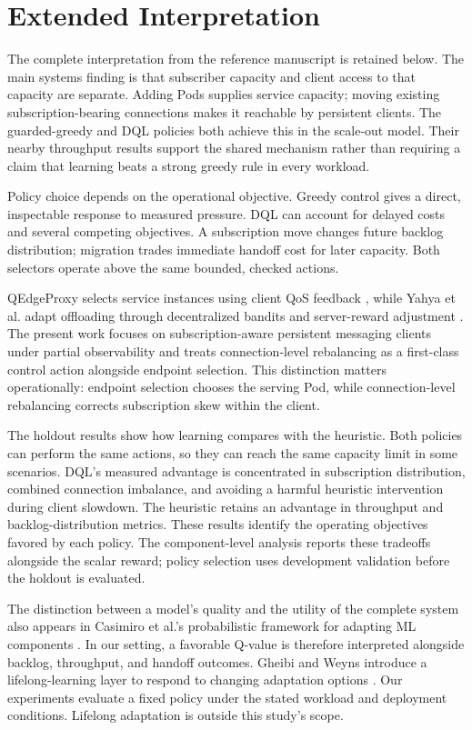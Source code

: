\section{Extended Interpretation}
The complete interpretation from the reference manuscript is retained below.
The main systems finding is that subscriber capacity and client access to that
capacity are separate. Adding Pods supplies service capacity; moving existing
subscription-bearing connections makes it reachable by persistent clients.
The guarded-greedy and DQL policies both achieve this in the scale-out model.
Their nearby throughput results support the shared mechanism rather than
requiring a claim that learning beats a strong greedy rule in every workload.

Policy choice depends on the operational objective. Greedy control gives a
direct, inspectable response to measured pressure. DQL can account for delayed
costs and several competing objectives. A subscription move changes future
backlog distribution; migration trades immediate handoff cost for later
capacity. Both selectors operate above the same bounded, checked actions.

QEdgeProxy selects service instances using client QoS feedback
\cite{Cilic2025}, while Yahya et al. adapt offloading through decentralized
bandits and server-reward adjustment \cite{Yahya2024}. The present work
focuses on subscription-aware persistent messaging clients under partial
observability and treats connection-level rebalancing as a first-class
control action alongside endpoint selection. This distinction
matters operationally: endpoint selection chooses the serving Pod, while
connection-level rebalancing corrects subscription skew within the client.

The holdout results show how learning compares with the heuristic.
Both policies can perform the same actions, so they can reach the same
capacity limit in some scenarios.  DQL's measured advantage is concentrated
in subscription distribution, combined connection imbalance, and avoiding a
harmful heuristic intervention during client slowdown.  The heuristic retains
an advantage in throughput and backlog-distribution metrics. These results
identify the operating objectives favored by each policy. The
component-level analysis reports these tradeoffs alongside the scalar reward;
policy selection uses development validation before the holdout is evaluated.

The distinction between a model's quality and the utility of the complete
system also appears in Casimiro et al.'s probabilistic framework for adapting
ML components \cite{Casimiro2024ModelChecking}. In our setting, a favorable
Q-value is therefore interpreted alongside backlog, throughput, and handoff
outcomes. Gheibi and Weyns introduce a lifelong-learning
layer to respond to changing adaptation options
\cite{Gheibi2024AdaptationDrift}. Our experiments evaluate a fixed policy under
the stated workload and deployment conditions. Lifelong adaptation is outside
this study's scope.

